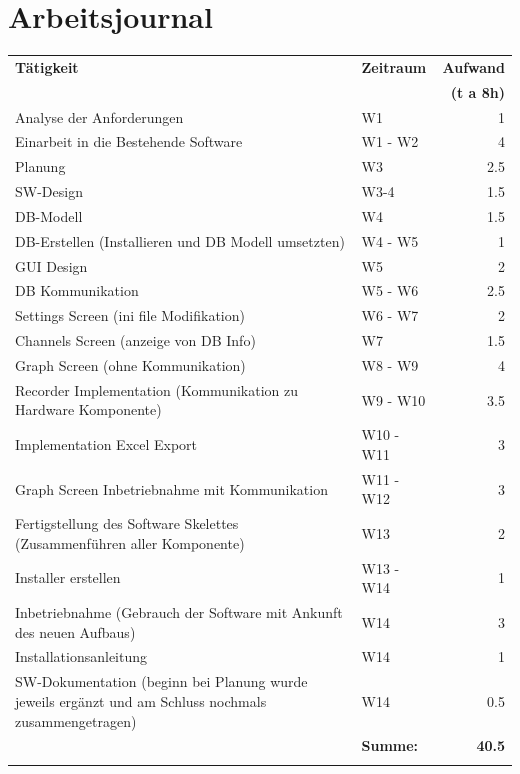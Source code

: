 \documentclass[10pt]{scrartcl}
\begin{document}
\section{Arbeitsjournal}
\begin{center}
	\begin{tabular}{p{6cm} | l | r}
		\textbf{Tätigkeit} & \textbf{Zeitraum} & \textbf{Aufwand} \\ &&\textbf{(t a 8h)}\\
		\hline Analyse der Anforderungen & W1 & 1 \\
		\hline Einarbeit in die Bestehende Software & W1 - W2 & 4 \\
		\hline Planung & W3 & 2.5 \\
		\hline SW-Design & W3-4 & 1.5 \\
		\hline DB-Modell & W4 & 1.5 \\
		\hline DB-Erstellen (Installieren und DB Modell umsetzten) & W4 - W5 & 1 \\
		\hline GUI Design & W5 & 2 \\
		\hline DB Kommunikation & W5 - W6 & 2.5 \\
		\hline Settings Screen (ini file Modifikation) & W6 - W7 & 2 \\
		\hline Channels Screen (anzeige von DB Info) & W7 & 1.5 \\
		\hline Graph Screen (ohne Kommunikation) & W8 - W9 & 4 \\
		\hline Recorder Implementation (Kommunikation zu Hardware Komponente) & W9 - W10 & 3.5 \\
		\hline Implementation Excel Export & W10 - W11 & 3 \\
		\hline Graph Screen Inbetriebnahme mit Kommunikation & W11 - W12 & 3 \\
		\hline Fertigstellung des Software Skelettes (Zusammenführen aller Komponente) & W13 & 2 \\
		\hline Installer erstellen & W13 - W14 & 1 \\
		\hline Inbetriebnahme (Gebrauch der Software mit Ankunft des neuen Aufbaus) & W14 & 3 \\
		\hline Installationsanleitung & W14 & 1 \\
		\hline SW-Dokumentation (beginn bei Planung wurde jeweils ergänzt und am Schluss nochmals zusammengetragen) & W14 & 0.5 \\\hhline{~--}
		& \textbf{Summe:} & \textbf{40.5} \\\hhline{~~=}
	\end{tabular}
\end{center}
\end{document}
